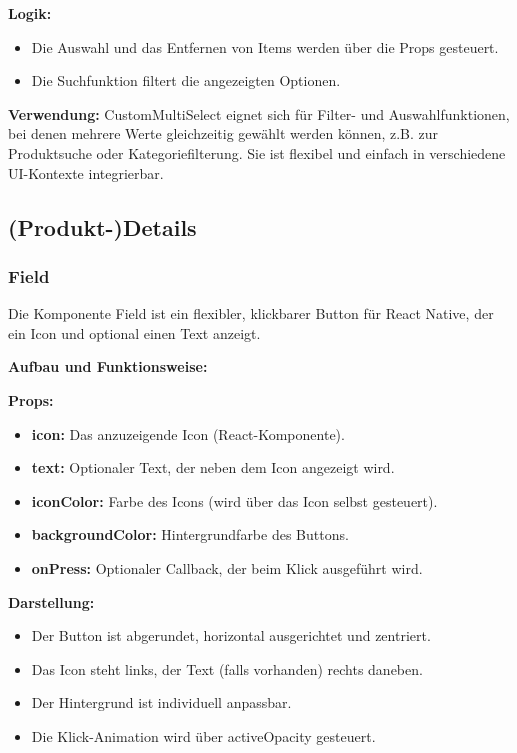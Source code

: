 \documentclass[12pt, a4paper]{report} %
\begin{document}
\textbf{Logik:}
\begin{itemize}
    \item Die Auswahl und das Entfernen von Items werden über die Props gesteuert.
    \item Die Suchfunktion filtert die angezeigten Optionen.
\end{itemize}

\noindent\textbf{Verwendung:} CustomMultiSelect eignet sich für Filter- und Auswahlfunktionen, bei denen mehrere Werte gleichzeitig gewählt werden können, z.B. zur Produktsuche oder Kategoriefilterung. Sie ist flexibel und einfach in verschiedene UI-Kontexte integrierbar.

\subsection{(Produkt-)Details}

\subsubsection{Field}
Die Komponente Field ist ein flexibler, klickbarer Button für React Native, der ein Icon und optional einen Text anzeigt.

\noindent\textbf{Aufbau und Funktionsweise:}

\textbf{Props:}
\begin{itemize}
    \item \textbf{icon:} Das anzuzeigende Icon (React-Komponente).
    \item \textbf{text:} Optionaler Text, der neben dem Icon angezeigt wird.
    \item \textbf{iconColor:} Farbe des Icons (wird über das Icon selbst gesteuert).
    \item \textbf{backgroundColor:} Hintergrundfarbe des Buttons.
    \item \textbf{onPress:} Optionaler Callback, der beim Klick ausgeführt wird.
\end{itemize}

\textbf{Darstellung:}
\begin{itemize}
    \item Der Button ist abgerundet, horizontal ausgerichtet und zentriert.
    \item Das Icon steht links, der Text (falls vorhanden) rechts daneben.
    \item Der Hintergrund ist individuell anpassbar.
    \item Die Klick-Animation wird über activeOpacity gesteuert.
\end{itemize}
\end{document}

